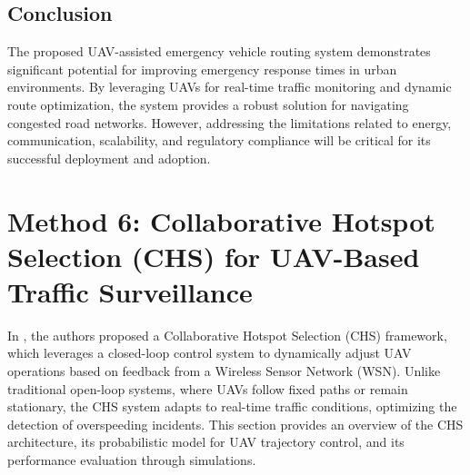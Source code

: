 \vspace{\baselineskip} %

\subsection{Conclusion}
The proposed UAV-assisted emergency vehicle routing system demonstrates significant potential for improving emergency response times in urban environments. By leveraging UAVs for real-time traffic monitoring and dynamic route optimization, the system provides a robust solution for navigating congested road networks. However, addressing the limitations related to energy, communication, scalability, and regulatory compliance will be critical for its successful deployment and adoption.


   
    
\section{Method 6: Collaborative Hotspot Selection (CHS) for UAV-Based Traffic Surveillance}
\label{sec:method6}

In \cite{bashir2022closed}, the authors proposed a Collaborative Hotspot Selection (CHS) framework, which leverages a closed-loop control system to dynamically adjust UAV operations based on feedback from a Wireless Sensor Network (WSN). Unlike traditional open-loop systems, where UAVs follow fixed paths or remain stationary, the CHS system adapts to real-time traffic conditions, optimizing the detection of overspeeding incidents. This section provides an overview of the CHS architecture, its probabilistic model for UAV trajectory control, and its performance evaluation through simulations.

\vspace{\baselineskip} %

